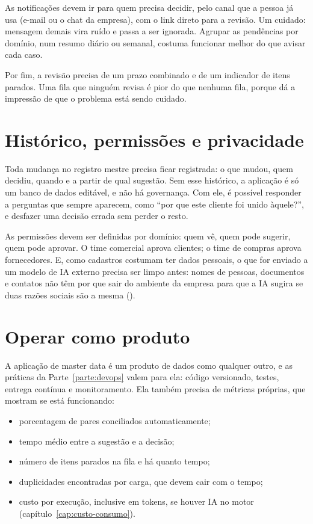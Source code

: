 As notificações devem ir para quem precisa decidir, pelo canal que a pessoa já usa (e-mail
ou o chat da empresa), com o link direto para a revisão. Um cuidado: mensagem demais vira
ruído e passa a ser ignorada. Agrupar as pendências por domínio, num resumo diário ou
semanal, costuma funcionar melhor do que avisar cada caso.

Por fim, a revisão precisa de um prazo combinado e de um indicador de itens parados. Uma
fila que ninguém revisa é pior do que nenhuma fila, porque dá a impressão de que o problema
está sendo cuidado.

\section{Histórico, permissões e privacidade}
\label{sec:auditoria-privacidade}

Toda mudança no registro mestre precisa ficar registrada: o que mudou, quem decidiu,
quando e a partir de qual sugestão. Sem esse histórico, a aplicação é só um banco de dados
editável, e não há governança. Com ele, é possível responder a perguntas que sempre
aparecem, como \enquote{por que este cliente foi unido àquele?}, e desfazer uma decisão
errada sem perder o resto.

As permissões devem ser definidas por domínio: quem vê, quem pode sugerir, quem pode
aprovar. O time comercial aprova clientes; o time de compras aprova fornecedores. E, como
cadastros costumam ter dados pessoais, o que for enviado a um modelo de IA externo precisa
ser limpo antes: nomes de pessoas, documentos e contatos não têm por que sair do ambiente da
empresa para que a IA sugira se duas razões sociais são a mesma ().

\section{Operar como produto}
\label{sec:operar-produto}

A aplicação de master data é um produto de dados como qualquer outro, e as práticas da
Parte~\ref{parte:devops} valem para ela: código versionado, testes, entrega contínua e
monitoramento. Ela também precisa de métricas próprias, que mostram se está funcionando:

\begin{itemize}
  \item porcentagem de pares conciliados automaticamente;
  \item tempo médio entre a sugestão e a decisão;
  \item número de itens parados na fila e há quanto tempo;
  \item duplicidades encontradas por carga, que devem cair com o tempo;
  \item custo por execução, inclusive em tokens, se houver IA no motor
    (capítulo~\ref{cap:custo-consumo}).
\end{itemize}

